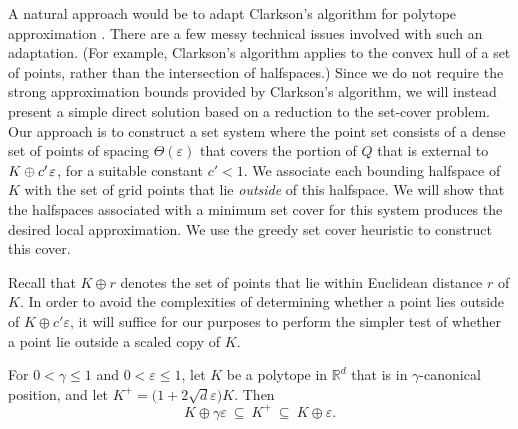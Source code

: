 \documentclass[11pt]{article}   \usepackage[letterpaper,hmargin=2.1cm,vmargin=3cm]{geometry}
\newcommand{\RE}{\mathbb{R}}    \newcommand{\ZZ}{\mathbb{Z}}    \newcommand{\eps}{\varepsilon}  \newcommand{\ST}{\,:\,}         \newcommand{\sq}{\square}
\renewcommand{\P}{\kern+1pt}    \newcommand{\N}{\kern-2pt}      \newcommand{\NN}{\kern-4pt}     \newcommand{\polar}[1]{\mathrm{polar}(#1)}            \newcommand{\polarX}[2]{\mathrm{polar}_{#1}(#2)}
\begin{document}
A natural approach would be to adapt Clarkson's algorithm for polytope approximation \cite{Clarkson-polytope}. There are a few messy technical issues involved with such an adaptation. (For example, Clarkson's algorithm applies to the convex hull of a set of points, rather than the intersection of halfspaces.) Since we do not require the strong approximation bounds provided by Clarkson's algorithm, we will instead present a simple direct solution based on a reduction to the set-cover problem. Our approach is to construct a set system where the point set consists of a dense set of points of spacing $\Theta(\eps)$ that covers the portion of $Q$ that is external to $K \oplus c' \P \eps$, for a suitable constant $c' < 1$. We associate each bounding halfspace of $K$ with the set of grid points that lie \emph{outside} of this halfspace. We will show that the halfspaces associated with a minimum set cover for this system produces the desired local approximation. We use the greedy set cover heuristic to construct this cover.

Recall that $K \oplus r$ denotes the set of points that lie within Euclidean distance $r$ of $K$. In order to avoid the complexities of determining whether a point lies outside of $K \oplus c' \eps$, it will suffice for our purposes to perform the simpler test of whether a point lie outside a scaled copy of $K$.

\begin{lemma} \label{lem:scaled-growth}
For $0 < \gamma \le 1$ and $0 < \eps \le 1$, let $K$ be a polytope in $\RE^d$ that is in $\gamma$-canonical position, and let $K^+ = \big(1 + 2 \sqrt{d} \eps\big) K$. Then 
\[
	K \oplus \gamma \eps
		~ \subseteq ~ K^+
		~ \subseteq ~ K \oplus \eps.
\]
\end{lemma}
\end{document}
